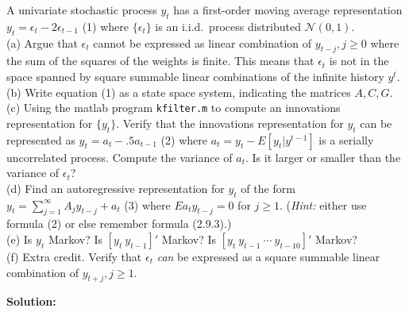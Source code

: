 \documentclass[12pt, letterpaper]{article}
\begin{document}
\begin{tcolorbox}[evenbox,title={Exercise 2.28 \quad Invertibility}]
\begin{tcolorbox}[questionbox]
A univariate stochastic process $y_t$ has a first-order moving average representation
$y_t=\epsilon_t-2\epsilon_{t-1}$ (1) where $\{\epsilon_t\}$ is an i.i.d.\ process distributed $\mathcal N(0,1)$.\\[3pt]
(a) Argue that $\epsilon_t$ cannot be expressed as linear combination of $y_{t-j},j\ge0$ where the sum
of the squares of the weights is finite. This means that $\epsilon_t$ is not in the space spanned by
square summable linear combinations of the infinite history $y^t$.\\
(b) Write equation (1) as a state space system, indicating the matrices $A,C,G$.\\
(c) Using the matlab program \texttt{kfilter.m} to compute an innovations representation for
$\{y_t\}$. Verify that the innovations representation for $y_t$ can be represented as
$y_t=a_t-.5a_{t-1}$ (2) where $a_t=y_t-E[y_t|y^{t-1}]$ is a serially uncorrelated process. Compute the
variance of $a_t$. Is it larger or smaller than the variance of $\epsilon_t$?\\
(d) Find an autoregressive representation for $y_t$ of the form $y_t=\sum_{j=1}^\infty A_jy_{t-j}+a_t$ (3)
where $Ea_ty_{t-j}=0$ for $j\ge1$. (\textit{Hint:} either use formula (2) or else remember formula
(2.9.3).)\\
(e) Is $y_t$ Markov? Is $[y_t\ y_{t-1}]'$ Markov? Is $[y_t\ y_{t-1}\ \cdots\ y_{t-10}]'$ Markov?\\
(f) Extra credit. Verify that $\epsilon_t$ \textit{can} be expressed as a square summable linear
combination of $y_{t+j},j\ge1$.
\end{tcolorbox}

\textbf{Solution:}


\end{tcolorbox}
\end{document}
